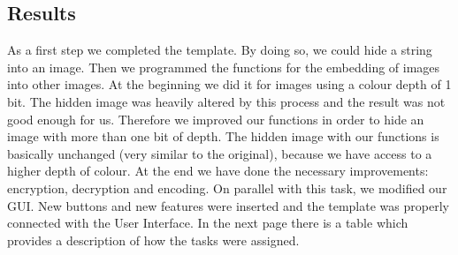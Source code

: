 \documentclass[
parskip=full,               %
12pt,                       %
twoside,                    %
a4paper                     %
]{article}
\begin{document}
	\subsection{Results}
	 As a first step we completed the template. By doing so, we could hide a string into an image.
Then we programmed the functions for the embedding of images into other images. At the beginning we did it for images using a colour depth of 1 bit. The hidden image was heavily altered by this process and the result was not good enough for us. Therefore we improved our functions in order to hide an image with more than one bit of depth. The hidden image with our functions is basically unchanged (very similar to the original), because we have access to a higher depth of colour.
At the end we have done the necessary improvements: encryption, decryption and encoding.
On parallel with this task, we modified our GUI. New buttons and new features were inserted and the template was properly connected with the User Interface. \newline
In the next page there is a table which provides a description of how the tasks were assigned.\newpage 
\end{document}
